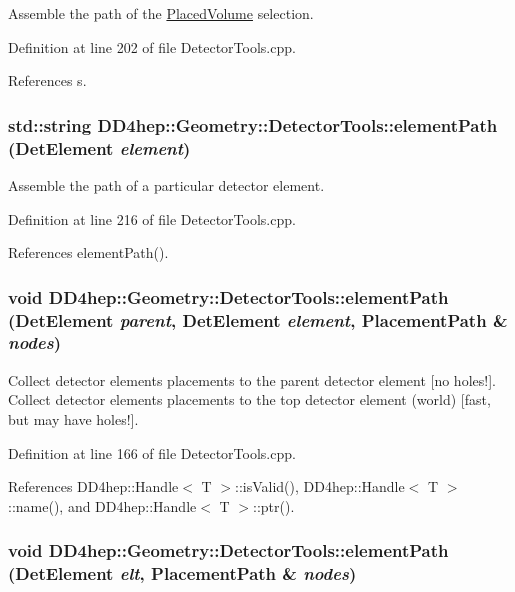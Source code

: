 Assemble the path of the \hyperlink{class_d_d4hep_1_1_geometry_1_1_placed_volume}{PlacedVolume} selection. 

Definition at line 202 of file DetectorTools.cpp.

References s.\hypertarget{namespace_d_d4hep_1_1_geometry_1_1_detector_tools_aa236d3ca69ed2eb4d7777db7c080216b}{
\subsubsection[{elementPath}]{\setlength{\rightskip}{0pt plus 5cm}std::string DD4hep::Geometry::DetectorTools::elementPath ({\bf DetElement} {\em element})}}
\label{namespace_d_d4hep_1_1_geometry_1_1_detector_tools_aa236d3ca69ed2eb4d7777db7c080216b}


Assemble the path of a particular detector element. 

Definition at line 216 of file DetectorTools.cpp.

References elementPath().\hypertarget{namespace_d_d4hep_1_1_geometry_1_1_detector_tools_a1855be34405c9ce43c236cfba6914850}{
\subsubsection[{elementPath}]{\setlength{\rightskip}{0pt plus 5cm}void DD4hep::Geometry::DetectorTools::elementPath ({\bf DetElement} {\em parent}, \/  {\bf DetElement} {\em element}, \/  {\bf PlacementPath} \& {\em nodes})}}
\label{namespace_d_d4hep_1_1_geometry_1_1_detector_tools_a1855be34405c9ce43c236cfba6914850}


Collect detector elements placements to the parent detector element \mbox{[}no holes!\mbox{]}. Collect detector elements placements to the top detector element (world) \mbox{[}fast, but may have holes!\mbox{]}. 

Definition at line 166 of file DetectorTools.cpp.

References DD4hep::Handle$<$ T $>$::isValid(), DD4hep::Handle$<$ T $>$::name(), and DD4hep::Handle$<$ T $>$::ptr().\hypertarget{namespace_d_d4hep_1_1_geometry_1_1_detector_tools_a2788bc98d530b548cab41a422c67b48b}{
\subsubsection[{elementPath}]{\setlength{\rightskip}{0pt plus 5cm}void DD4hep::Geometry::DetectorTools::elementPath ({\bf DetElement} {\em elt}, \/  {\bf PlacementPath} \& {\em nodes})}}
\label{namespace_d_d4hep_1_1_geometry_1_1_detector_tools_a2788bc98d530b548cab41a422c67b48b}


